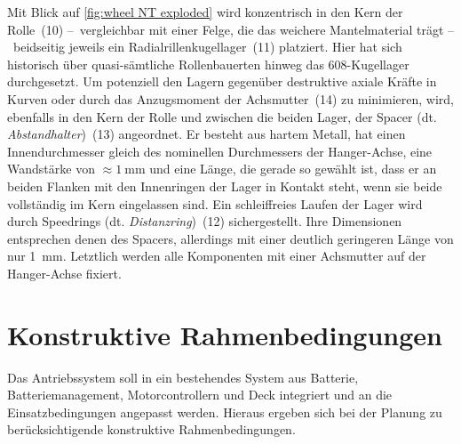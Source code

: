 		Mit Blick auf \cref{fig:wheel NT exploded} wird konzentrisch in den Kern der Rolle~(10) --~vergleichbar mit einer Felge, die das weichere Mantelmaterial trägt --~beidseitig jeweils ein Radialrillenkugellager~(11) platziert.
		Hier hat sich historisch über quasi-sämtliche Rollenbauerten hinweg das 608-Kugellager durchgesetzt.
		Um potenziell den Lagern gegenüber destruktive axiale Kräfte in Kurven oder durch das Anzugsmoment der Achsmutter~(14) zu minimieren, wird, ebenfalls in den Kern der Rolle und zwischen die beiden Lager, der Spacer (dt. \textit{Abstandhalter})~(13) angeordnet.
		Er besteht aus hartem Metall, hat einen Innendurchmesser gleich des nominellen Durchmessers der Hanger-Achse, eine Wandstärke von \(\approx \qty{1}{\milli\metre}\) und eine Länge, die gerade so gewählt ist, dass er an beiden Flanken mit den Innenringen der Lager in Kontakt steht, wenn sie beide vollständig im Kern eingelassen sind.
		Ein schleiffreies Laufen der Lager wird durch Speedrings (dt. \textit{Distanzring})~(12) sichergestellt.
		Ihre Dimensionen entsprechen denen des Spacers, allerdings mit einer deutlich geringeren Länge von nur \qty{1}{\milli\metre}.
		Letztlich werden alle Komponenten mit einer Achsmutter auf der Hanger-Achse fixiert.
	\section{Konstruktive Rahmenbedingungen}\label{sec:constructive limitations}
		Das Antriebssystem soll in ein bestehendes System aus Batterie, Batteriemanagement, Motorcontrollern und Deck integriert und an die Einsatzbedingungen angepasst werden.
		Hieraus ergeben sich bei der Planung zu berücksichtigende konstruktive Rahmenbedingungen.
